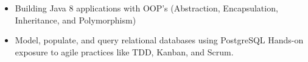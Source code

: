 \documentclass[10pt,a4paper]{altacv}
\begin{document}
\clearpage



\begin{itemize}
\item Building Java 8 applications with OOP's (Abstraction, Encapsulation,
Inheritance, and Polymorphism)
\item Model, populate, and query relational databases using PostgreSQL Hands-on exposure to agile practices like TDD, Kanban, and Scrum.

\end{itemize}
\divider



\end{document}
